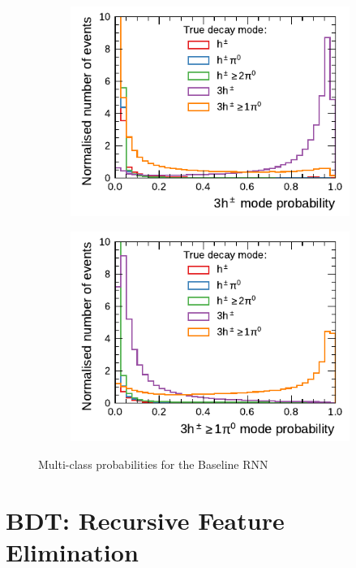 \begin{figure}[!ht]
\begin{subfigure}{0.48\textwidth}
  \end{subfigure}\hfill
  \begin{subfigure}{0.48\textwidth}
    \centering
    \includegraphics{./figures/decay_mode_classification/mode_proba_baseline_ptcut_1_5/proba_3p0n.pdf}
  \end{subfigure}
  \begin{subfigure}{0.48\textwidth}
    \centering
    \includegraphics{./figures/decay_mode_classification/mode_proba_baseline_ptcut_1_5/proba_3pXn.pdf}
  \end{subfigure}%

  \caption{Multi-class probabilities for the Baseline RNN}
  \label{fig:rnn_multiclass_proba_baseline}
\end{figure}

\clearpage
\section{BDT: Recursive Feature Elimination}

